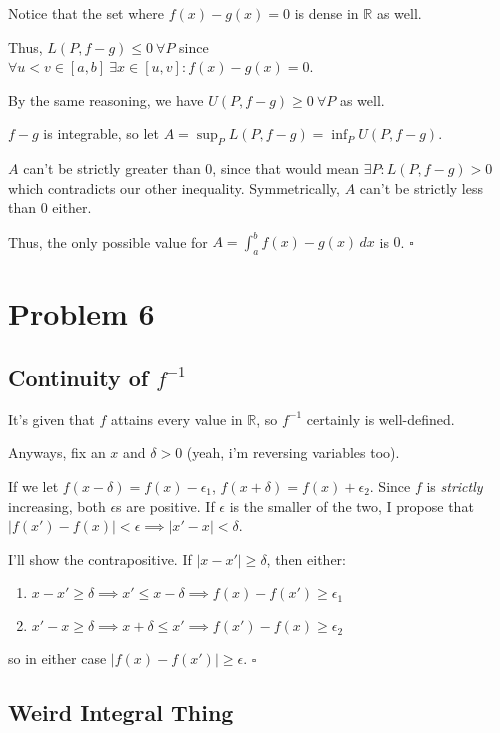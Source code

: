 \documentclass[12pt]{article}
\newcommand{\R}{\mathbb{R}}
\begin{document}
Notice that the set where $f(x)-g(x)=0$ is dense in $\R$ as well.

Thus, $L(P, f-g) \le 0\ \forall P$ since $\forall u < v \in [a, b]\ \exists x \in [u, v]: f(x)-g(x)=0$.

By the same reasoning, we have $U(P, f-g) \ge 0\ \forall P$ as well.

$f-g$ is integrable, so let $A=\sup_{P} L(P, f-g) = \inf_{P} U(P, f-g)$.

$A$ can't be strictly greater than $0$, since that would mean
$\exists P: L(P, f-g) > 0$ which contradicts our other inequality.
Symmetrically, $A$ can't be strictly less than $0$ either.

Thus, the only possible value for $A=\int_{a}^{b} f(x)-g(x)\,dx$ is $0$. $\square$

\section{Problem 6}

\subsection{Continuity of \texorpdfstring{$f^{-1}$}{f inverse}}

It's given that $f$ attains every value in $\R$, so $f^{-1}$ certainly is well-defined.

Anyways, fix an $x$ and $\delta > 0$ (yeah, i'm reversing variables too).

If we let $f(x-\delta)=f(x)-\epsilon_1$, $f(x+\delta)=f(x)+\epsilon_2$.
Since $f$ is \textit{strictly} increasing, both $\epsilon$s are positive.
If $\epsilon$ is the smaller of the two, I propose that
$|f(x')-f(x)| < \epsilon \implies|x'-x| < \delta$.

I'll show the contrapositive.
If $|x-x'| \ge \delta$, then either:
\begin{enumerate}[nolistsep]
  \item $x-x' \ge \delta \implies x' \le x-\delta \implies f(x)-f(x') \ge \epsilon_1$
  \item $x'-x \ge \delta \implies x+\delta \le x' \implies f(x')-f(x) \ge \epsilon_2$
\end{enumerate}
so in either case $|f(x)-f(x')| \ge \epsilon$. $\square$

\pagebreak

\subsection{Weird Integral Thing}
\end{document}
